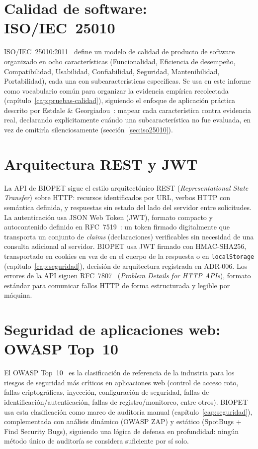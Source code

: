 \section{Calidad de software: ISO/IEC~25010}

ISO/IEC~25010:2011~\cite{iso25010-2011} define un modelo de calidad de
producto de software organizado en ocho caracter\'isticas (Funcionalidad,
Eficiencia de desempe\~no, Compatibilidad, Usabilidad, Confiabilidad,
Seguridad, Mantenibilidad, Portabilidad), cada una con subcaracter\'isticas
espec\'ificas. Se usa en este informe como vocabulario com\'un para
organizar la evidencia emp\'irica recolectada (cap\'itulo~\ref{cap:pruebas-calidad}),
siguiendo el enfoque de aplicaci\'on pr\'actica descrito por Estdale \&
Georgiadou~\cite{estdale2018applying25010}: mapear cada caracter\'istica
contra evidencia real, declarando expl\'icitamente cu\'ando una
subcaracter\'istica no fue evaluada, en vez de omitirla silenciosamente
(secci\'on~\ref{sec:iso25010}).

\section{Arquitectura REST y JWT}

La API de BIOPET sigue el estilo arquitect\'onico REST (\emph{Representational
State Transfer}) sobre HTTP: recursos identificados por URL, verbos HTTP
con sem\'antica definida, y respuestas sin estado del lado del servidor
entre solicitudes. La autenticaci\'on usa JSON Web Token (JWT), formato
compacto y autocontenido definido en RFC~7519~\cite{rfc7519}: un token
firmado digitalmente que transporta un conjunto de \emph{claims}
(declaraciones) verificables sin necesidad de una consulta adicional al
servidor. BIOPET usa JWT firmado con HMAC-SHA256, transportado en cookies
en vez de en el cuerpo de la respuesta o en \texttt{localStorage}
(cap\'itulo~\ref{cap:seguridad}), decisi\'on de arquitectura registrada en
ADR-006. Los errores de la API siguen RFC~7807~\cite{rfc7807}
(\emph{Problem Details for HTTP APIs}), formato est\'andar para comunicar
fallos HTTP de forma estructurada y legible por m\'aquina.

\section{Seguridad de aplicaciones web: OWASP Top~10}

El OWASP Top~10~\cite{owasp-top10} es la clasificaci\'on de referencia de
la industria para los riesgos de seguridad m\'as cr\'iticos en aplicaciones
web (control de acceso roto, fallas criptogr\'aficas, inyecci\'on,
configuraci\'on de seguridad, fallas de identificaci\'on/autenticaci\'on,
fallas de registro/monitoreo, entre otros). BIOPET usa esta clasificaci\'on
como marco de auditor\'ia manual (cap\'itulo~\ref{cap:seguridad}),
complementada con an\'alisis din\'amico (OWASP ZAP) y est\'atico (SpotBugs
+ Find Security Bugs), siguiendo una l\'ogica de defensa en profundidad:
ning\'un m\'etodo \'unico de auditor\'ia se considera suficiente por s\'i
solo.

